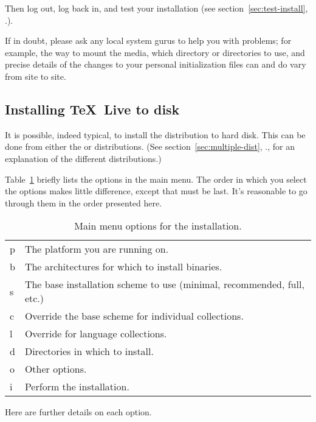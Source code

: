 \documentclass{article}
\begin{document}
\noindent Then log out, log back in, and test your installation
(see section~\ref{sec:test-install}, \p.\pageref{sec:test-install}).

\def\textifindoubt{%
If in doubt, please ask any local system gurus to help you with
problems; for example, the way to mount the \TL{} media, which
directory or directories to use, and precise details of the changes to
your personal initialization files can and do vary from site to site.
}
\textifindoubt


% 
\subsection{Installing \protect\TeX\protect\ Live to disk}
\label{sec:unix-install-disk}

It is possible, indeed typical, to install the \TL{} distribution to
hard disk.  This can be done from either the  or
 distributions.  (See section~\ref{sec:multiple-dist},
\p.\pageref{sec:multiple-dist}, for an explanation of the different
distributions.)

\startinst
\installtlsh

Table~\ref{tab:main-menu-options} briefly lists the options in the main
menu.  The order in which you select the options makes little
difference, except that  must be last.  It's reasonable to go
through them in the order presented here.

\begin{table}[H]
\caption{Main menu options for the installation.}
\label{tab:main-menu-options}
\begin{tabular}{>{\ttfamily}ll}
p & The platform you are running on.\\
b & The architectures for which to install binaries.\\
s & The base installation scheme to use (minimal, recommended,
          full, etc.)\\
c & Override the base scheme for individual collections.\\
l & Override for language collections.\\
d & Directories in which to install.\\
o & Other options.\\
i & Perform the installation.\\
\end{tabular}
\end{table}

Here are further details on each option.
\end{document}
